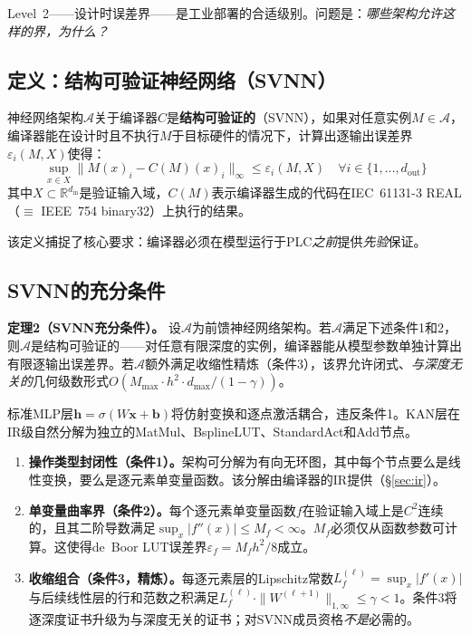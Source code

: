 Level~2——设计时误差界——是工业部署的合适级别。问题是：\textit{哪些架构允许这样的界，为什么？}

\subsection{定义：结构可验证神经网络（SVNN）}
\label{sec:svnn-definition}

\begin{definition}[结构可验证神经网络]
\label{def:svnn}
神经网络架构$\mathcal{A}$关于编译器$C$是\textbf{结构可验证的}（SVNN），如果对任意实例$M \in \mathcal{A}$，编译器能在设计时且不执行$M$于目标硬件的情况下，计算出逐输出误差界$\varepsilon_i(M, X)$使得：
\begin{equation}
\sup_{x \in X} \|M(x)_i - C(M)(x)_i\|_\infty \leq \varepsilon_i(M, X)
\quad \forall i \in \{1, \dots, d_{\text{out}}\}
\label{eq:svnn_def}
\end{equation}
其中$X \subset \mathbb{R}^{d_{\text{in}}}$是验证输入域，$C(M)$表示编译器生成的代码在IEC~61131-3 REAL（$\equiv$ IEEE~754 binary32）上执行的结果。
\end{definition}

该定义捕捉了核心要求：编译器必须在模型运行于PLC\textit{之前}提供\textit{先验}保证。

\subsection{SVNN的充分条件}
\label{sec:svnn-conditions}

\vspace{4pt}
\noindent\textbf{定理2（SVNN充分条件）。}
\label{thm:svnn_conditions}
设$\mathcal{A}$为前馈神经网络架构。若$\mathcal{A}$满足下述条件1和2，则$\mathcal{A}$是结构可验证的——对任意有限深度的实例，编译器能从模型参数单独计算出有限逐输出误差界。若$\mathcal{A}$额外满足收缩性精炼（条件3），该界允许闭式、\textit{与深度无关的}几何级数形式$O(M_{\max} \cdot h^2 \cdot d_{\max} / (1-\gamma))$。

标准MLP层$\mathbf{h} = \sigma(W\mathbf{x} + \mathbf{b})$将仿射变换和逐点激活耦合，违反条件1。KAN层在IR级自然分解为独立的MatMul、BsplineLUT、StandardAct和Add节点。

\begin{enumerate}
    \item \textbf{操作类型封闭性（条件1）。}架构可分解为有向无环图，其中每个节点要么是线性变换，要么是逐元素单变量函数。该分解由编译器的IR提供（\S\ref{sec:ir}）。

    \item \textbf{单变量曲率界（条件2）。}每个逐元素单变量函数$f$在验证输入域上是$C^2$连续的，且其二阶导数满足$\sup_x |f''(x)| \leq M_f < \infty$。$M_f$必须仅从函数参数可计算。这使得de~Boor LUT误差界$\varepsilon_f = M_f h^2/8$成立。

    \item \textbf{收缩组合（条件3，精炼）。}每逐元素层的Lipschitz常数$L_f^{(\ell)} = \sup_x |f'(x)|$与后续线性层的行和范数之积满足$L_f^{(\ell)} \cdot \|W^{(\ell+1)}\|_{1,\infty} \leq \gamma < 1$。条件3将逐深度证书升级为与深度无关的证书；对SVNN成员资格\textit{不是}必需的。
\end{enumerate}

